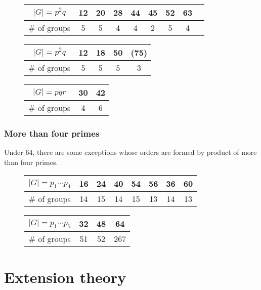 \documentclass{../exp}
\begin{document}
\begin{figure}[h!]
\begin{tabular}{c|cccccccc}
\hline
$|G|=p^2q$&12&20&28&44&45&52&63\\
\hline
$\#$ of groups&5&5&4&4&2&5&4\\
\hline
\end{tabular}
\vspace{10pt}

\begin{tabular}{c|cccc}
\hline
$|G|=p^2q$&12&18&50&(75)\\
\hline
$\#$ of groups&5&5&5&3\\
\hline
\end{tabular}
\hspace{10pt}
\begin{tabular}{c|cc}
\hline
$|G|=pqr$&30&42\\
\hline
$\#$ of groups&4&6\\
\hline
\end{tabular}
\end{figure}




\subsubsection{More than four primes}
Under 64, there are some exceptions whose orders are formed by product of more than four primes.
\begin{figure}[h!]
\begin{tabular}{c|c|cccc|c|c}
\hline
$|G|=p_1\cdots p_4$&16&24&40&54&56&36&60\\
\hline
$\#$ of groups&14&15&14&15&13&14&13\\
\hline
\end{tabular}
\vspace{10pt}

\begin{tabular}{c|c|c|c}
\hline
$|G|=p_1\cdots p_5$&32&48&64\\
\hline
$\#$ of groups&51&52&267\\
\hline
\end{tabular}
\end{figure}






\section{Extension theory}
\end{document}
